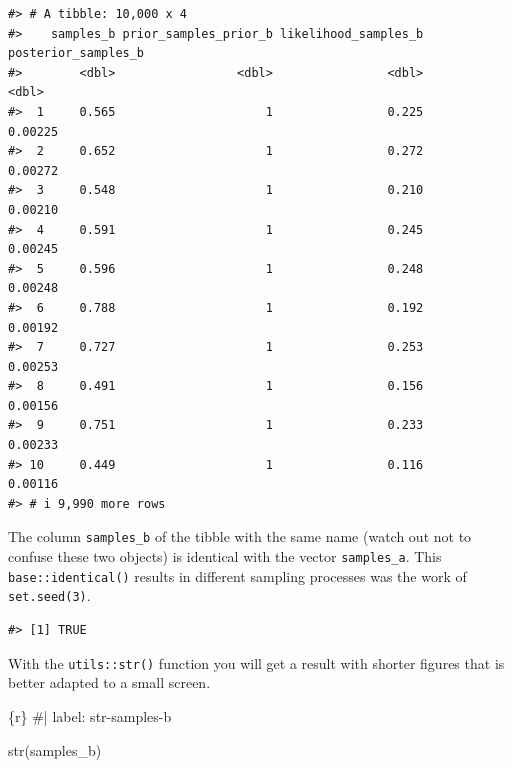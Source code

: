 \documentclass[
  letterpaper,
  DIV=11,
  numbers=noendperiod]{scrreprt}
\newenvironment{Shaded}{\begin{snugshade}}{\end{snugshade}}
\newcommand{\CommentTok}[1]{\textcolor[rgb]{0.37,0.37,0.37}{#1}}
\newcommand{\FunctionTok}[1]{\textcolor[rgb]{0.28,0.35,0.67}{#1}}
\newcommand{\InformationTok}[1]{\textcolor[rgb]{0.37,0.37,0.37}{#1}}
\newcommand{\NormalTok}[1]{\textcolor[rgb]{0.00,0.23,0.31}{#1}}
\newcommand{\SpecialCharTok}[1]{\textcolor[rgb]{0.37,0.37,0.37}{#1}}
\begin{document}
\begin{verbatim}
#> # A tibble: 10,000 x 4
#>    samples_b prior_samples_prior_b likelihood_samples_b posterior_samples_b
#>        <dbl>                 <dbl>                <dbl>               <dbl>
#>  1     0.565                     1                0.225             0.00225
#>  2     0.652                     1                0.272             0.00272
#>  3     0.548                     1                0.210             0.00210
#>  4     0.591                     1                0.245             0.00245
#>  5     0.596                     1                0.248             0.00248
#>  6     0.788                     1                0.192             0.00192
#>  7     0.727                     1                0.253             0.00253
#>  8     0.491                     1                0.156             0.00156
#>  9     0.751                     1                0.233             0.00233
#> 10     0.449                     1                0.116             0.00116
#> # i 9,990 more rows
\end{verbatim}

The column \texttt{samples\_b} of the tibble with the same name (watch
out not to confuse these two objects) is identical with the vector
\texttt{samples\_a}. This \texttt{base::identical()} results in
different sampling processes was the work of \texttt{set.seed(3)}.

\begin{Shaded}
\end{Shaded}

\begin{verbatim}
#> [1] TRUE
\end{verbatim}

With the \texttt{utils::str()} function you will get a result with
shorter figures that is better adapted to a small screen.

\begin{Shaded}
\begin{Highlighting}[]
\InformationTok{\textasciigrave{}\textasciigrave{}\textasciigrave{}\{r\}}
\CommentTok{\#| label: str{-}samples{-}b}

\FunctionTok{str}\NormalTok{(samples\_b)}
\InformationTok{\textasciigrave{}\textasciigrave{}\textasciigrave{}}
\end{Highlighting}
\end{Shaded}
\end{document}
